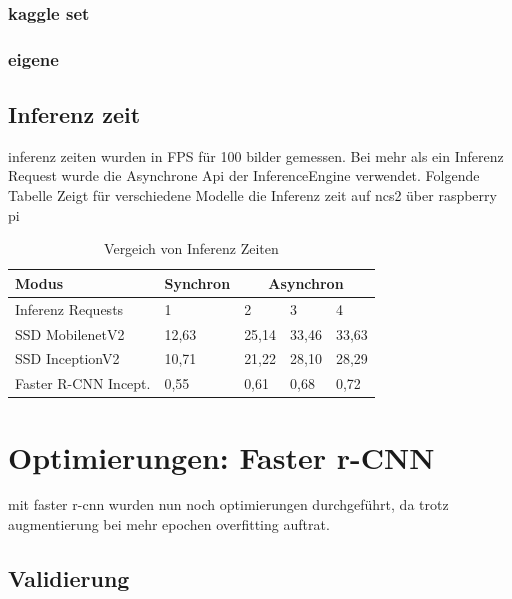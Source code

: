 \subsubsection{kaggle set}
\subsubsection{eigene}


\subsection{Inferenz zeit}

inferenz zeiten wurden in FPS für 100 bilder gemessen. Bei 
mehr als ein Inferenz Request wurde die Asynchrone Api der InferenceEngine 
verwendet.
Folgende Tabelle Zeigt für verschiedene Modelle die 
Inferenz zeit auf ncs2 über raspberry pi

\begin{table}[htb]
  \centering
  \label{table:infer_zeit}
  \begin{tabular}{m{}|m{}<{\centering}|m{}<{\centering}|m{}<{\centering}|m{}<{\centering}}
  \hline
  Modus                & Synchron & \multicolumn{3}{c}{Asynchron} \\ \hline
  Inferenz Requests    & 1        & 2        & 3        & 4        \\ \hline\hline
  SSD MobilenetV2      & 12,63    & 25,14    & 33,46    & 33,63    \\
  SSD InceptionV2      & 10,71    & 21,22    & 28,10    & 28,29    \\
  Faster R-CNN Incept. & 0,55     & 0,61     & 0,68     & 0,72     \\ \hline
  \end{tabular}
  \caption{Vergeich von Inferenz Zeiten}
\end{table}


\section{Optimierungen: Faster r-CNN}
mit faster r-cnn wurden nun noch optimierungen durchgeführt, da 
trotz augmentierung bei mehr epochen overfitting auftrat.


\subsection{Validierung}


